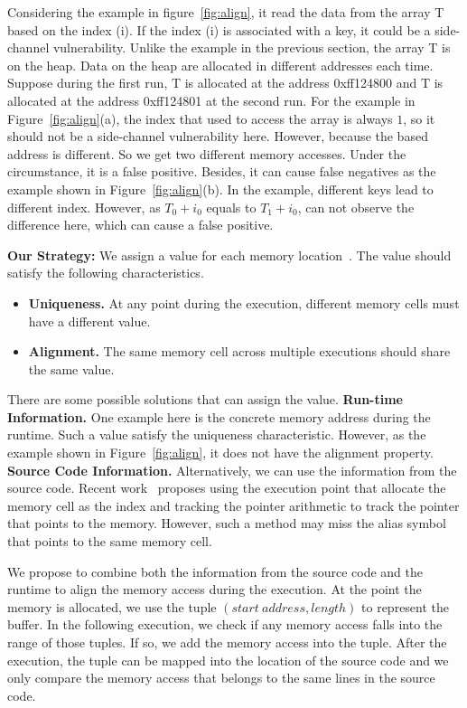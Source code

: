 Considering the example in figure~\ref{fig:align}, it read the data from the array \textsf{T} based on the index (i). If the index (i) is associated with a key, it could be a side-channel vulnerability. Unlike the example in the previous section, the array \textsf{T} is on the heap. Data on the heap are allocated in different addresses each time. Suppose during the first run, \textsf{T} is allocated at the address \textsf{0xff124800} and \textsf{T} is allocated at the address \textsf{0xff124801} at the second run. For the example in Figure~\ref{fig:align}(a), the index that used to access the array is always $1$, so it should not be a side-channel vulnerability here. However, because the based address is different. So we get two different memory accesses. Under the circumstance, it is a false positive. Besides, it can cause false negatives as the example shown in Figure~\ref{fig:align}(b). In the example, different keys lead to different index. However, as $T_0 + i_0$ equals to $T_1 + i_0$, \tool{} can not observe the difference here, which can cause a false positive.

\textbf{Our Strategy: } We assign a value for each memory location~\cite{sumner2010memory}. The value should satisfy the following characteristics. 
\begin{itemize}
\item \textbf{Uniqueness.} At any point during the execution, different memory cells must have a different value.
\item \textbf{Alignment.} The same memory cell across multiple executions should share the same value.
\end{itemize}

There are some possible solutions that can assign the value.
\textbf{Run-time Information.} One example here is the concrete memory address during the runtime. Such a value satisfy the uniqueness characteristic. However, as the example shown in Figure~\ref{fig:align}, it does not have the alignment property.
\textbf{Source Code Information.} Alternatively, we can use the information from the source code. Recent work~\cite{sumner2010memory} proposes using the execution point that allocate the memory cell as the index and tracking the pointer arithmetic to track the pointer that points to the memory. However, such a method may miss the alias symbol that points to the same memory cell.

We propose to combine both the information from the source code and the runtime to align the memory access during the execution. At the point the memory is allocated, we use the tuple $(start\ address, length)$ to represent the buffer. In the following execution, we check if any memory access falls into the range of those tuples. If so, we add the memory access into the tuple. After the execution, the tuple can be mapped into the location of the source code and we only compare the memory access that belongs to the same lines in the source code.

